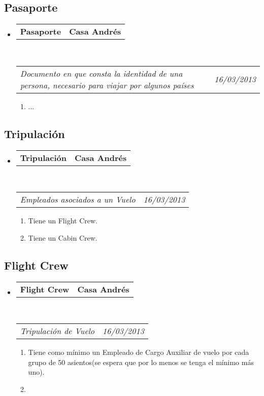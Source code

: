 \documentclass[10pt,letterpaper]{article}
\makeatletter
\newcommand{\headerrow}[2]
{\begin{tabular*}{\linewidth}{l@{\extracolsep{\fill}}r}
	#1 &
	#2 \\
\end{tabular*}}
\makeatother
\begin{document}
\subsection*{Pasaporte}

\begin{itemize}
	\parskip=0.1em

	\item
	\headerrow
		{\textbf{Pasaporte}}
		{\textbf{Casa Andrés}}
	\\
	\headerrow
		{\emph{Documento en que consta la identidad de una persona, necesario para viajar por algunos países}}
		{\emph{16/03/2013}}
	\begin{enumerate}
		\item ...
	\end{enumerate}

\end{itemize}

\subsection*{Tripulación}

\begin{itemize}
	\parskip=0.1em

	\item
	\headerrow
		{\textbf{Tripulación}}
		{\textbf{Casa Andrés}}
	\\
	\headerrow
		{\emph{Empleados asociados a un Vuelo}}
		{\emph{16/03/2013}}
	\begin{enumerate}
		\item Tiene un Flight Crew.
		\item Tiene un Cabin Crew.
	\end{enumerate}

\end{itemize}

\subsection*{Flight Crew}

\begin{itemize}
	\parskip=0.1em

	\item
	\headerrow
		{\textbf{Flight Crew}}
		{\textbf{Casa Andrés}}
	\\
	\headerrow
		{\emph{Tripulación de Vuelo}}
		{\emph{16/03/2013}}
	\begin{enumerate}
		\item Tiene como mínimo un Empleado de Cargo Auxiliar de vuelo por cada grupo de 50 asientos(se espera que por lo menos se tenga el mínimo más uno).
		\item
	\end{enumerate}

\end{itemize}
\end{document}
